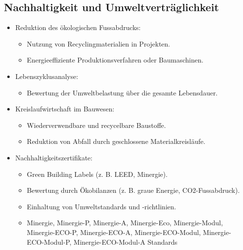 \documentclass[
11pt,
captions=tableheading,
smallheadings,
headsepline,
footsepline, 
captions=tableheading,
parskip=half-,
]{scrartcl}
\begin{document}
\subsection{Nachhaltigkeit und Umweltverträglichkeit}
\begin{itemize}
    \item Reduktion des ökologischen Fussabdrucks:
          \begin{itemize}
              \item Nutzung von Recyclingmaterialien in Projekten.
              \item Energieeffiziente Produktionsverfahren oder Baumaschinen.
          \end{itemize}
    \item Lebenszyklusanalyse:
          \begin{itemize}
              \item Bewertung der Umweltbelastung über die gesamte Lebensdauer.
          \end{itemize}
    \item Kreislaufwirtschaft im Bauwesen:
          \begin{itemize}
              \item Wiederverwendbare und recycelbare Baustoffe.
              \item Reduktion von Abfall durch geschlossene Materialkreisläufe.
          \end{itemize}
    \item Nachhaltigkeitszertifikate:
          \begin{itemize}
              \item Green Building Labels (z. B. LEED, Minergie).
              \item Bewertung durch Ökobilanzen (z. B. graue Energie, CO2-Fussabdruck).
              \item Einhaltung von Umweltstandards und -richtlinien.
              \item Minergie, Minergie-P, Minergie-A, Minergie-Eco, Minergie-Modul, Minergie-ECO-P, Minergie-ECO-A, Minergie-ECO-Modul, Minergie-ECO-Modul-P, Minergie-ECO-Modul-A Standards
          \end{itemize}
\end{itemize}
\end{document}
